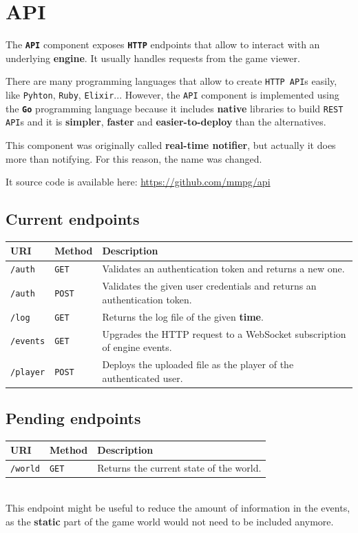 \documentclass[a4paper,11pt,titlepage,abstract,numbers=noenddot,automark,mnsy,intlimits,rgb,dvipsnames]{report}
\begin{document}
\chapter{API}
The \textbf{\texttt{API}} component exposes \textbf{\texttt{HTTP}} endpoints that allow to interact with an underlying \textbf{engine}. It
usually handles requests from the game viewer.

There are many programming languages that allow to create \texttt{HTTP API}s easily, like \texttt{Pyhton}, \texttt{Ruby}, \texttt{Elixir}... However,
the \texttt{API} component is implemented using the \textbf{\texttt{Go}} programming language because it includes \textbf{native}
libraries to build \texttt{REST API}s and it is \textbf{simpler}, \textbf{faster} and \textbf{easier-to-deploy} than the alternatives.

This component was originally called \textbf{real-time notifier}, but actually it does more than notifying. For this reason,
the name was changed.

It source code is available here: \url{https://github.com/mmpg/api}
\section{Current endpoints}
\begin{tabularx}{\textwidth}{l | l | X}
\textbf{URI} & \textbf{Method} & \textbf{Description}\\
\hline
\texttt{/auth} & \texttt{GET} & Validates an authentication token and returns a new one.\\
\texttt{/auth} & \texttt{POST} & Validates the given user credentials and returns an authentication token.\\
\texttt{/log} & \texttt{GET} & Returns the log file of the given \textbf{time}.\\
\texttt{/events} & \texttt{GET} & Upgrades the HTTP request to a WebSocket subscription of engine events.\\
\texttt{/player} & \texttt{POST} & Deploys the uploaded file as the player of the authenticated user.\\
\end{tabularx}
\section{Pending endpoints}
\begin{tabularx}{\textwidth}{l | l | X}
\textbf{URI} & \textbf{Method} & \textbf{Description}\\
\hline
\texttt{/world} & \texttt{GET} & Returns the current state of the world.\\
\end{tabularx}
\\[0.2cm]
\indent
This endpoint might be useful to reduce the amount of information in the events, as the \textbf{static} part of
the game world would not need to be included anymore.
\clearpage
\end{document}
